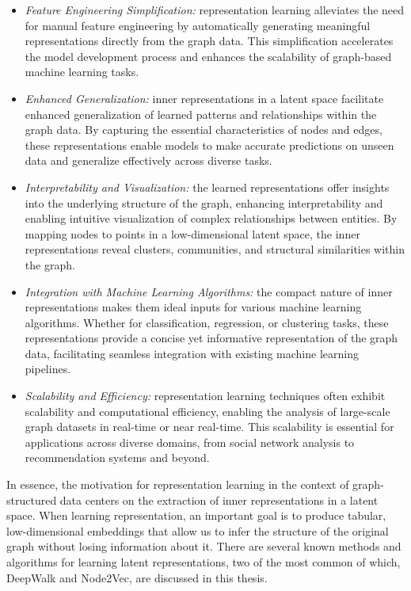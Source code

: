 \begin{itemize}

    \item \emph{Feature Engineering Simplification:} representation learning alleviates the need for manual feature engineering by automatically generating meaningful representations directly from the graph data. This simplification accelerates the model development process and enhances the scalability of graph-based machine learning tasks.

    \item \emph{Enhanced Generalization:} inner representations in a latent space facilitate enhanced generalization of learned patterns and relationships within the graph data. By capturing the essential characteristics of nodes and edges, these representations enable models to make accurate predictions on unseen data and generalize effectively across diverse tasks.

    \item \emph{Interpretability and Visualization:} the learned representations offer insights into the underlying structure of the graph, enhancing interpretability and enabling intuitive visualization of complex relationships between entities. By mapping nodes to points in a low-dimensional latent space, the inner representations reveal clusters, communities, and structural similarities within the graph.

    \item \emph{Integration with Machine Learning Algorithms:} the compact nature of inner representations makes them ideal inputs for various machine learning algorithms. Whether for classification, regression, or clustering tasks, these representations provide a concise yet informative representation of the graph data, facilitating seamless integration with existing machine learning pipelines.

    \item \emph{Scalability and Efficiency:} representation learning techniques often exhibit scalability and computational efficiency, enabling the analysis of large-scale graph datasets in real-time or near real-time. This scalability is essential for applications across diverse domains, from social network analysis to recommendation systems and beyond.

\end{itemize}

In essence, the motivation for representation learning in the context of graph-structured data centers on the extraction of inner representations in a latent space. When learning representation, an important goal is to produce tabular, low-dimensional embeddings that allow us to infer the structure of the original graph without losing information about it. There are several known methods and algorithms for learning latent representations, two of the most common of which, DeepWalk and Node2Vec, are discussed in this thesis.

